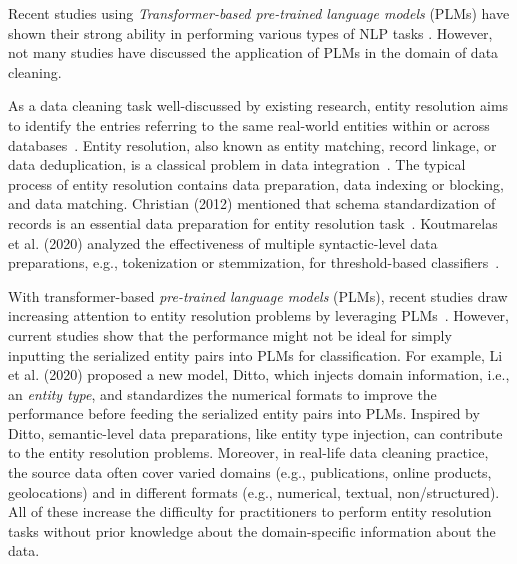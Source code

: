 

Recent studies using \emph{Transformer-based pre-trained language models} (PLMs) have shown their strong ability in performing various types of NLP tasks \cite{min_recent_2021}. However, not many studies have discussed the application of PLMs in the domain of data cleaning. 

As a data cleaning task well-discussed by existing research, entity resolution aims to identify the entries referring to the same real-world entities within or across databases~\cite{christen_data_2012}. Entity resolution, also known as entity matching, record linkage, or data deduplication, is a classical problem in data integration~\cite{zhao_auto-em_2019}. The typical process of entity resolution contains data preparation, data indexing or blocking, and data matching. 
Christian (2012) mentioned that schema standardization of records is an essential data preparation for entity resolution task~\cite{christen_data_2012}. 
Koutmarelas et al. (2020) analyzed the effectiveness of multiple syntactic-level data preparations, e.g., tokenization or stemmization, for threshold-based classifiers~\cite{koumarelas_data_2020}. 

With transformer-based \emph{pre-trained language models} (PLMs), recent studies draw increasing attention to entity resolution problems by leveraging PLMs~\cite{li_deep_2020, trabelsi_dame_2022}. However, current studies show that the performance might not be ideal for simply inputting the serialized entity pairs into PLMs for classification. For example, Li et al. (2020) proposed a new model, Ditto, which injects domain information, i.e., an \emph{entity type}, and standardizes the numerical formats to improve the performance before feeding the serialized entity pairs into PLMs. Inspired by Ditto, semantic-level data preparations, like entity type injection, can contribute to the entity resolution problems. Moreover, 
in real-life data cleaning practice, the source data often cover varied domains (e.g., publications, online products, geolocations) and in different formats (e.g., numerical, textual, non/structured). All of these increase the difficulty for practitioners to perform entity resolution tasks without prior knowledge about the domain-specific information about the data.


